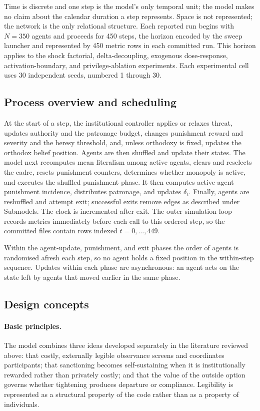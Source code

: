 \documentclass[12pt]{article}
\begin{document}
Time is discrete and one step is the model's only temporal unit; the model
makes no claim about the calendar duration a step represents. Space is not
represented; the network is the only relational structure. Each reported run
begins with \(N=350\) agents and proceeds for 450 steps, the horizon encoded by
the sweep launcher and represented by 450 metric rows in each committed run.
This horizon applies to the shock factorial, delta-decoupling, exogenous
dose-response, activation-boundary, and privilege-ablation experiments. Each
experimental cell uses 30 independent seeds, numbered 1 through 30.

\subsection{Process overview and scheduling}

At the start of a step, the institutional controller applies or relaxes threat,
updates authority and the patronage budget, changes punishment reward and
severity and the heresy threshold, and, unless orthodoxy is fixed, updates the
orthodox belief position. Agents are then shuffled and update their states. The
model next recomputes mean literalism among active agents, clears and reselects
the cadre, resets punishment counters, determines whether monopoly is active,
and executes the shuffled punishment phase. It then computes active-agent
punishment incidence, distributes patronage, and updates \(\delta_t\). Finally,
agents are reshuffled and attempt exit; successful exits remove edges as
described under Submodels. The clock is incremented after exit. The outer
simulation loop records metrics immediately before each call to this ordered
step, so the committed files contain rows indexed \(t=0,\ldots,449\).

Within the agent-update, punishment, and exit phases the order of agents is
randomised afresh each step, so no agent holds a fixed position in the
within-step sequence. Updates within each phase are asynchronous: an agent acts
on the state left by agents that moved earlier in the same phase.

\subsection{Design concepts}

\paragraph{Basic principles.} The model combines three ideas developed
separately in the literature reviewed above: that costly, externally legible
observance screens and coordinates participants; that sanctioning becomes
self-sustaining when it is institutionally rewarded rather than privately
costly; and that the value of the outside option governs whether tightening
produces departure or compliance. Legibility is represented as a structural
property of the code rather than as a property of individuals.
\end{document}
